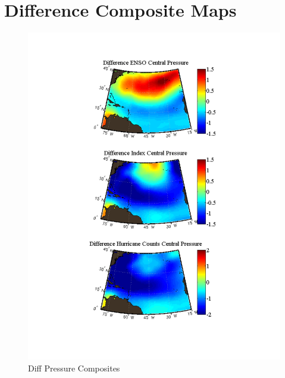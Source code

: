 \documentclass[]{article}
\begin{document}
\section{Difference Composite Maps}
\begin{figure}[ht]
\begin{minipage}[b]{0.55\linewidth}
\includegraphics[width=\textwidth]{figures/sensitivityResults/compositeMaps/centralPressureAtlanticMap.pdf}
\caption{Diff Pressure Composites}
\label{fig:figure21}
\end{minipage}
\hspace{0cm}
\begin{minipage}[b]{0.55\linewidth}

\end{minipage}
\end{figure}
\end{document}
